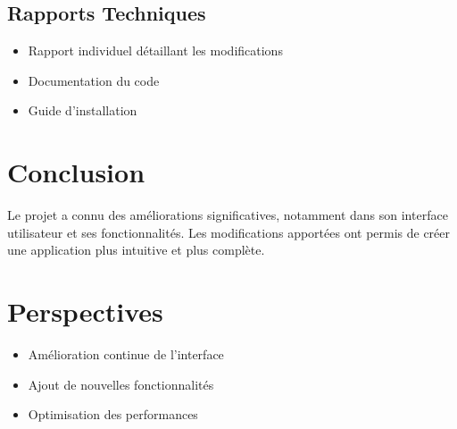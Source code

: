 \documentclass[12pt,a4paper]{article}
\begin{document}
\subsection{Rapports Techniques}
\begin{itemize}
    \item Rapport individuel détaillant les modifications
    \item Documentation du code
    \item Guide d'installation
\end{itemize}

\section{Conclusion}
Le projet a connu des améliorations significatives, notamment dans son interface utilisateur et ses fonctionnalités. Les modifications apportées ont permis de créer une application plus intuitive et plus complète.

\section{Perspectives}
\begin{itemize}
    \item Amélioration continue de l'interface
    \item Ajout de nouvelles fonctionnalités
    \item Optimisation des performances
\end{itemize}
\end{document}
